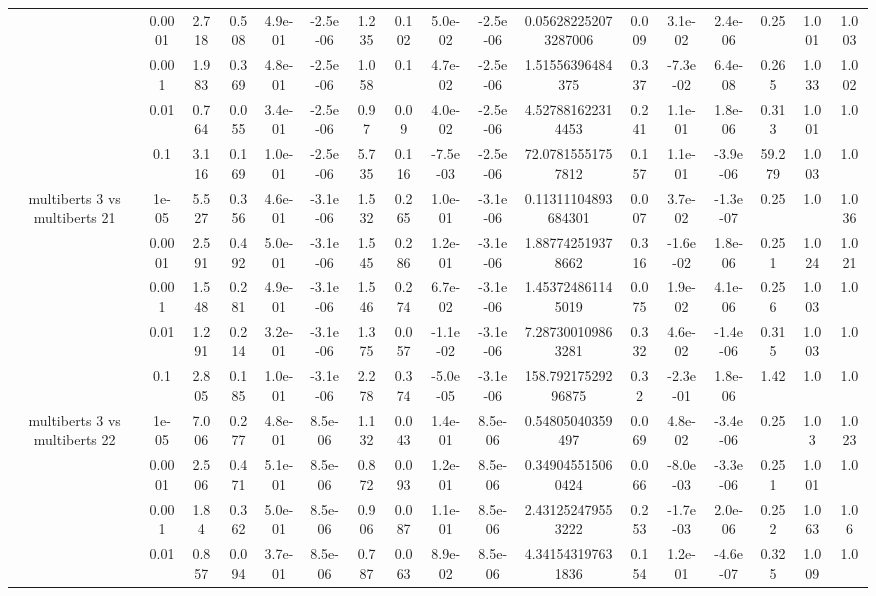 \begin{tabular}{|c|c|c|c|c|c|c|c|c|c|c|c|c|c|c|c|c|}
 & 0.0001 & 2.718 & 0.508 & 4.9e-01 & -2.5e-06 & 1.235 & 0.102 & 5.0e-02 & -2.5e-06 & 0.056282252073287006 & 0.009 & 3.1e-02 & 2.4e-06 & 0.25 & 1.001 & 1.003 \\
 & 0.001 & 1.983 & 0.369 & 4.8e-01 & -2.5e-06 & 1.058 & 0.1 & 4.7e-02 & -2.5e-06 & 1.51556396484375 & 0.337 & -7.3e-02 & 6.4e-08 & 0.265 & 1.033 & 1.002 \\
 & 0.01 & 0.764 & 0.055 & 3.4e-01 & -2.5e-06 & 0.97 & 0.09 & 4.0e-02 & -2.5e-06 & 4.527881622314453 & 0.241 & 1.1e-01 & 1.8e-06 & 0.313 & 1.001 & 1.0 \\
 & 0.1 & 3.116 & 0.169 & 1.0e-01 & -2.5e-06 & 5.735 & 0.116 & -7.5e-03 & -2.5e-06 & 72.07815551757812 & 0.157 & 1.1e-01 & -3.9e-06 & 59.279 & 1.003 & 1.0 \\
\hline
\multirow{5}{*}{multiberts 3 vs multiberts 21} & 1e-05 & 5.527 & 0.356 & 4.6e-01 & -3.1e-06 & 1.532 & 0.265 & 1.0e-01 & -3.1e-06 & 0.11311104893684301 & 0.007 & 3.7e-02 & -1.3e-07 & 0.25 & 1.0 & 1.036 \\
 & 0.0001 & 2.591 & 0.492 & 5.0e-01 & -3.1e-06 & 1.545 & 0.286 & 1.2e-01 & -3.1e-06 & 1.887742519378662 & 0.316 & -1.6e-02 & 1.8e-06 & 0.251 & 1.024 & 1.021 \\
 & 0.001 & 1.548 & 0.281 & 4.9e-01 & -3.1e-06 & 1.546 & 0.274 & 6.7e-02 & -3.1e-06 & 1.453724861145019 & 0.075 & 1.9e-02 & 4.1e-06 & 0.256 & 1.003 & 1.0 \\
 & 0.01 & 1.291 & 0.214 & 3.2e-01 & -3.1e-06 & 1.375 & 0.057 & -1.1e-02 & -3.1e-06 & 7.287300109863281 & 0.332 & 4.6e-02 & -1.4e-06 & 0.315 & 1.003 & 1.0 \\
 & 0.1 & 2.805 & 0.185 & 1.0e-01 & -3.1e-06 & 2.278 & 0.374 & -5.0e-05 & -3.1e-06 & 158.79217529296875 & 0.32 & -2.3e-01 & 1.8e-06 & 1.42 & 1.0 & 1.0 \\
\hline
\multirow{5}{*}{multiberts 3 vs multiberts 22} & 1e-05 & 7.006 & 0.277 & 4.8e-01 & 8.5e-06 & 1.132 & 0.043 & 1.4e-01 & 8.5e-06 & 0.54805040359497 & 0.069 & 4.8e-02 & -3.4e-06 & 0.25 & 1.03 & 1.023 \\
 & 0.0001 & 2.506 & 0.471 & 5.1e-01 & 8.5e-06 & 0.872 & 0.093 & 1.2e-01 & 8.5e-06 & 0.349045515060424 & 0.066 & -8.0e-03 & -3.3e-06 & 0.251 & 1.001 & 1.0 \\
 & 0.001 & 1.84 & 0.362 & 5.0e-01 & 8.5e-06 & 0.906 & 0.087 & 1.1e-01 & 8.5e-06 & 2.431252479553222 & 0.253 & -1.7e-03 & 2.0e-06 & 0.252 & 1.063 & 1.06 \\
 & 0.01 & 0.857 & 0.094 & 3.7e-01 & 8.5e-06 & 0.787 & 0.063 & 8.9e-02 & 8.5e-06 & 4.341543197631836 & 0.154 & 1.2e-01 & -4.6e-07 & 0.325 & 1.009 & 1.0 \\

\end{tabular}

